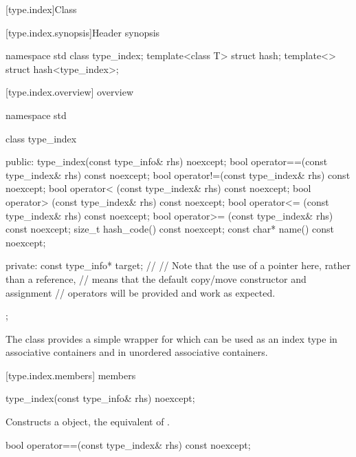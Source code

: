 [type.index]{Class }

[type.index.synopsis]{Header  synopsis}

%
\begin{codeblock}
namespace std {
  class type_index;
  template<class T> struct hash;
  template<> struct hash<type_index>;
}
\end{codeblock}

[type.index.overview]{ overview}

%
\begin{codeblock}
namespace std {
  class type_index {
  public:
    type_index(const type_info& rhs) noexcept;
    bool operator==(const type_index& rhs) const noexcept;
    bool operator!=(const type_index& rhs) const noexcept;
    bool operator< (const type_index& rhs) const noexcept;
    bool operator> (const type_index& rhs) const noexcept;
    bool operator<= (const type_index& rhs) const noexcept;
    bool operator>= (const type_index& rhs) const noexcept;
    size_t hash_code() const noexcept;
    const char* name() const noexcept;

  private:
    const type_info* target;    // \expos
    // Note that the use of a pointer here, rather than a reference,
    // means that the default copy/move constructor and assignment
    // operators will be provided and work as expected.
  };
}
\end{codeblock}

\pnum
The class  provides a simple wrapper for
 which can be used as an index type in associative
containers and in unordered associative
containers.

[type.index.members]{ members}

%
\begin{itemdecl}
type_index(const type_info& rhs) noexcept;
\end{itemdecl}

\begin{itemdescr}
\pnum
\effects Constructs a  object, the equivalent of .
\end{itemdescr}

%
\begin{itemdecl}
bool operator==(const type_index& rhs) const noexcept;
\end{itemdecl}

